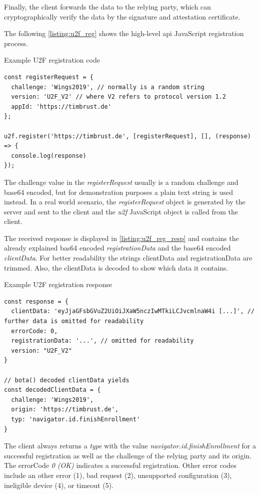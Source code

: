 Finally, the client forwards the data to the relying party, which can cryptographically verify the data by the signature and attestation certificate.

The following \autoref{listing:u2f_reg} shows the high-level \gls{api} JavaScript registration process. 

\begin{example}{Example U2F registration code}
\begin{verbatim}
const registerRequest = {
  challenge: 'Wings2019', // normally is a random string
  version: 'U2F_V2' // where V2 refers to protocol version 1.2
  appId: 'https://timbrust.de'
};

u2f.register('https://timbrust.de', [registerRequest], [], (response) => {
  console.log(response)
});
\end{verbatim}
\label{listing:u2f_reg}
\end{example}

The challenge value in the \textit{registerRequest} usually is a random challenge and base64 encoded, but for demonstration purposes a plain text string is used instead. In a real world scenario, the \textit{registerRequest} object is generated by the server and sent to the client and the \textit{u2f} JavaScript object is called from the client.

The received response is displayed in \autoref{listing:u2f_reg_resp} and contains the already explained bas64 encoded \textit{registrationData} and the base64 encoded \textit{clientData}. For better readability the strings clientData and registrationData are trimmed. Also, the clientData is decoded to show which data it contains.

\begin{example}{Example U2F registration response}
\begin{verbatim}
const response = {
  clientData: 'eyJjaGFsbGVuZ2UiOiJXaW5nczIwMTkiLCJvcmlnaW4i [...]', // further data is omitted for readability
  errorCode: 0,
  registrationData: '...', // omitted for readability
  version: "U2F_V2"
}

// bota() decoded clientData yields
const decodedClientData = {
  challenge: 'Wings2019',
  origin: 'https://timbrust.de',
  typ: 'navigator.id.finishEnrollment'
}
\end{verbatim}
\label{listing:u2f_reg_resp}
\end{example}

The client always returns a \textit{type} with the value \textit{navigator.id.finishEnrollment} for a successful registration as well as the challenge of the relying party and its origin. The errorCode \textit{0 (OK)} indicates a successful registration. Other error codes include an other error (1), bad request (2), unsupported configuration (3), ineligible device (4), or timeout (5).

